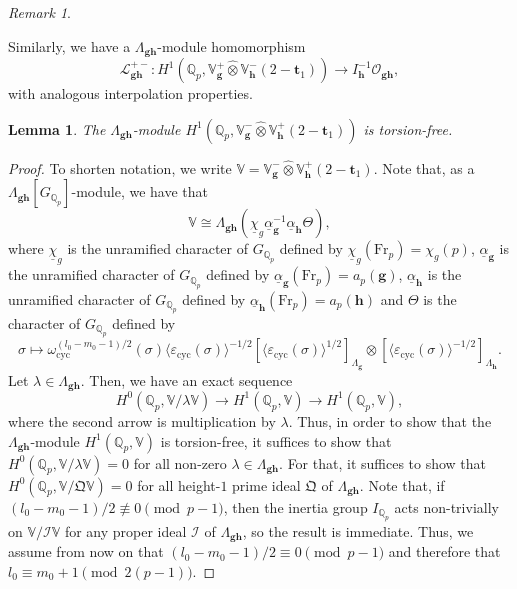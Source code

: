 \documentclass[a4paper,11pt]{amsart}
\theoremstyle{plain}
\newtheorem{lemma}[theorem]{Lemma}
\theoremstyle{definition}
\theoremstyle{remark}
\newtheorem{remarkwr}[theorem]{Remark}
\newenvironment{remark}{\begin{remarkwr}\begin{upshape}}{\end{upshape}\end{remarkwr}}
\newcommand{\bb}{\mathbb}
\newcommand{\frk}{\mathfrak}
\newcommand{\cl}{\mathcal}
\DeclareMathOperator{\cyc}{cyc}
\newcommand{\Fr}{\mathrm{Fr}}
\newcommand{\hg}{{\mathbf{g}}}
\newcommand{\hh}{{\mathbf h}}
\numberwithin{equation}{section}
\begin{document}
\begin{remark}
    Similarly, we have a $\Lambda_{\hg\hh}$-module homomorphism
    \[
    \mathcal L_{\hg \hh}^{+-}: H^1(\mathbb Q_p, \mathbb V_{\hg}^+ \hat \otimes \mathbb V_{\hh}^- (2-\mathbf{t}_1)) \rightarrow  I_{\hh}^{-1}\cl{O}_{\hg \hh},
    \]
    with analogous interpolation properties.
\end{remark}

\begin{lemma}
    The $\Lambda_{\hg\hh}$-module $H^1(\bb{Q}_p,\bb{V}_{\hg}^{-}\hat{\otimes}\bb{V}_{\hh}^+(2-\mathbf{t}_1))$ is torsion-free.
\end{lemma}
\begin{proof}
    To shorten notation, we write $\bb{V}=\bb{V}_{\hg}^{-}\hat{\otimes}\bb{V}_{\hh}^+(2-\mathbf{t}_1)$. Note that, as a $\Lambda_{\hg\hh}[G_{\bb{Q}_p}]$-module, we have that
    \[
    \bb{V}\cong \Lambda_{\hg\hh}(\underline{\chi}_g \underline{\alpha}_{\hg}^{-1} \underline{\alpha}_{\hh}\Theta),
    \]
    where $\underline{\chi}_g$ is the unramified character of $G_{\bb{Q}_p}$ defined by $\underline{\chi}_g(\Fr_p)=\chi_g(p)$, $\underline{\alpha}_{\hg}$ is the unramified character of $G_{\bb{Q}_p}$ defined by $\underline{\alpha}_{\hg}(\Fr_p)=a_p(\hg)$, $\underline{\alpha}_{\hh}$ is the unramified character of $G_{\bb{Q}_p}$ defined by $\underline{\alpha}_{\hh}(\Fr_p)=a_p(\hh)$ and $\Theta$ is the character of $G_{\bb{Q}_p}$ defined by
    \[
    \sigma\mapsto \omega_{\cyc}^{(l_0-m_0-1)/2}(\sigma) \langle \varepsilon_{\cyc}(\sigma)\rangle^{-1/2} [\langle \varepsilon_{\cyc}(\sigma)\rangle^{1/2}]_{\Lambda_{\hg}} \otimes [\langle \varepsilon_{\cyc}(\sigma)\rangle^{-1/2}]_{\Lambda_{\hh}}.
    \]
    Let $\lambda\in \Lambda_{\hg\hh}$. Then, we have an exact sequence
    \[
    H^0(\bb{Q}_p,\bb{V}/\lambda\bb{V})\rightarrow H^1(\bb{Q}_p,\bb{V})\rightarrow H^1(\bb{Q}_p,\bb{V}),
    \]
    where the second arrow is multiplication by $\lambda$. Thus, in order to show that the $\Lambda_{\hg\hh}$-module $H^1(\bb{Q}_p,\bb{V})$ is torsion-free, it suffices to show that $H^0(\bb{Q}_p,\bb{V}/\lambda\bb{V})=0$ for all non-zero $\lambda\in \Lambda_{\hg\hh}$. For that, it suffices to show that $H^0(\bb{Q}_p,\bb{V}/\frk{Q}\bb{V})=0$ for all height-$1$ prime ideal $\frk{Q}$ of $\Lambda_{\hg\hh}$. Note that, if $(l_0-m_0-1)/2\not\equiv 0 \pmod{p-1}$, then the inertia group $I_{\bb{Q}_p}$ acts non-trivially on $\bb{V}/\cl{I}\bb{V}$ for any proper ideal $\cl{I}$ of $\Lambda_{\hg\hh}$, so the result is immediate. Thus, we assume from now on that $(l_0-m_0-1)/2\equiv 0 \pmod{p-1}$ and therefore that $l_0\equiv m_0+1 \pmod{2(p-1)}$.


\end{proof}
\end{document}
